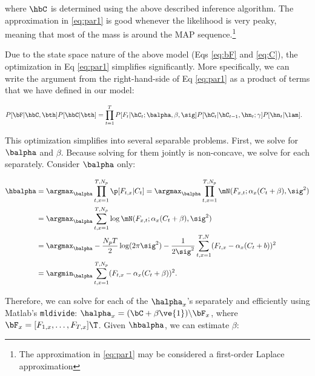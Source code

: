 \noindent where $\hbC$ is determined using the above described inference algorithm. The approximation in \eqref{eq:par1} is good whenever the likelihood is very peaky, meaning that most of the mass is around the MAP sequence.\footnote{The approximation in \eqref{eq:par1} may be considered a first-order Laplace approximation}  

Due to the state space nature of the above model (Eqs \eqref{eq:bF} and \eqref{eq:C}), the optimization in Eq \eqref{eq:par1} simplifies significantly.  More specifically, we can write the argument from the right-hand-side of Eq \eqref{eq:par1} as a product of terms that we have defined in our model:

 \begin{align} \label{eq:par2}
P[\bF| \hbC, \bth] P[\hbC | \bth] &= \prod_{t=1}^T P[F_t | \hC_t; \balpha, \beta,\sig] P[\hC_t | \hC_{t-1}, \hn_t; \gamma] P[\hn_t | \lam].
\end{align}

\noindent This optimization simplifies into several separable problems.  %
First, we solve for $\balpha$ and $\beta$.  Because solving for them jointly is non-concave, we solve for each separately.  Consider $\balpha$ only:

\begin{subequations}
\begin{align}
\hbalpha 
&= \argmax_{\balpha} \prod_{t,x=1}^{T,N_p}  \p[F_{t,x} | C_t] 
=  \argmax_{\balpha} \prod_{t,x=1}^{T,N_p} \mN(F_{x,t}; \alpha_x ( C_t + \beta), \sig^2) \\
&= \argmax_{\balpha} \sum_{t,x=1}^{T,N_p} \log \mN (F_{x,t}; \alpha_x ( C_t + \beta), \sig^2)  \\
&= \argmax_{\balpha}  -\frac{N_p T}{2}\log(2\pi \sig^2) -\frac{1}{2\sig^2}\sum_{t,x=1}^{T,N} (F_{t,x} - \alpha_x(C_t + b))^2 \\
&= \argmin_{\balpha} \sum_{t,x=1}^{T,N_p} (F_{t,x} - \alpha_x(C_t + \beta))^2.
\end{align}
\end{subequations}

Therefore, we can solve for each of the $\halpha_x$'s separately and efficiently using Matlab's  \texttt{mldivide}: 
%
	$\halpha_x = (\bC + \beta\ve{1})\backslash \bF_x$, 
%
where $\bF_x=[F_{1,x}, \ldots, F_{T,x}]\T$. Given $\hbalpha$, we can estimate $\beta$:

